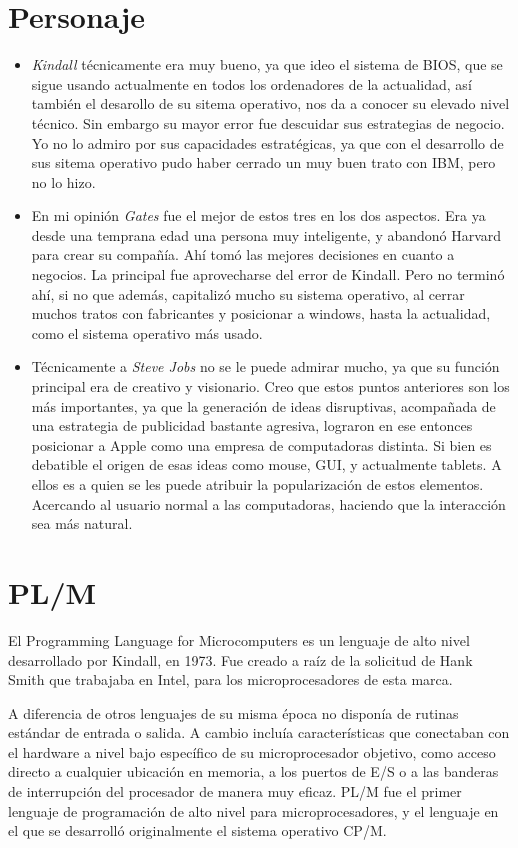 \documentclass[a4paper,12pt]{article}
\begin{document}
\section{Personaje} 
\begin{itemize}
\item \textit{Kindall} técnicamente era muy bueno, ya que ideo el sistema de BIOS, que se sigue usando actualmente en todos los ordenadores de la actualidad, así también el desarollo de su sitema operativo, nos da a conocer su elevado nivel técnico. Sin embargo su mayor error fue descuidar sus estrategias de negocio. Yo no lo admiro por sus capacidades estratégicas, ya que con el desarrollo de sus sitema operativo pudo haber cerrado un muy buen trato con IBM, pero no lo hizo.
\item En mi opinión \textit{Gates} fue el mejor de estos tres en los dos aspectos. Era ya desde una temprana edad una persona muy inteligente, y abandonó Harvard para crear su compañía. Ahí tomó las mejores decisiones en cuanto a negocios. La principal fue aprovecharse del error de Kindall. Pero no terminó ahí, si no que además, capitalizó mucho su sistema operativo, al cerrar muchos tratos con fabricantes y posicionar a windows, hasta la actualidad, como el sistema operativo más usado.
\item Técnicamente a \textit{Steve Jobs} no se le puede admirar mucho, ya que su función principal era de creativo y visionario. Creo que estos puntos anteriores son los más importantes, ya que la generación de ideas disruptivas, acompañada de una estrategia de publicidad bastante agresiva, lograron en ese entonces posicionar a Apple como una empresa de computadoras distinta. Si bien es debatible el origen de esas ideas como mouse, GUI, y actualmente tablets. A ellos es a quien se les puede atribuir la popularización de estos elementos. Acercando al usuario normal a las computadoras, haciendo que la interacción sea más natural.

\end{itemize}
\section{PL/M} 
El Programming Language for Microcomputers es un lenguaje de alto nivel desarrollado por Kindall, en 1973. Fue creado a raíz de la solicitud de Hank Smith que trabajaba en Intel, para los microprocesadores de esta marca.

A diferencia de otros lenguajes de su misma época no disponía de rutinas estándar de entrada o salida. A cambio incluía características que conectaban con el hardware a nivel bajo específico de su microprocesador objetivo, como acceso directo a cualquier ubicación en memoria, a los puertos de E/S o a las banderas de interrupción del procesador de manera muy eficaz. PL/M fue el primer lenguaje de programación de alto nivel para microprocesadores, y el lenguaje en el que se desarrolló originalmente el sistema operativo CP/M.
\end{document}
